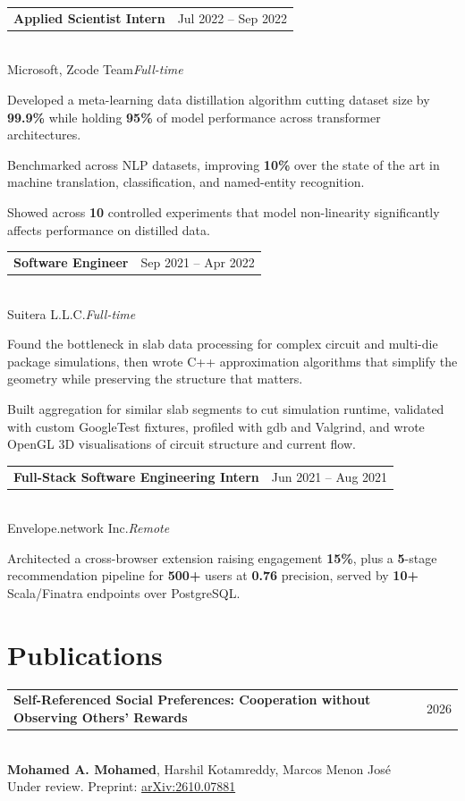 \documentclass[10pt,a4paper]{article}
\makeatletter
\newcommand{\role}[4]{%
  \vspace{3pt}
  \noindent\begin{tabularx}{\textwidth}{@{}Xr@{}}
    \textbf{#1} & \textcolor{muted}{\small #4}
  \end{tabularx}\\[1pt]
  \textcolor{accent}{#2}\;\textcolor{muted}{\small\textit{#3}}\vspace{2pt}
}
\newcommand{\paper}[4]{%
  \vspace{4pt}
  \noindent\begin{tabularx}{\textwidth}{@{}Xr@{}}
    \textbf{#1} & \textcolor{muted}{\small #4}
  \end{tabularx}\\[1pt]
  {\small #2}\\[1pt]
  {\small\textcolor{accent}{#3}}\vspace{2pt}
}
\makeatother
\begin{document}
\role{Applied Scientist Intern}{Microsoft, Zcode Team}{Full-time}{Jul 2022 -- Sep 2022}
\begin{pts}
  \item Developed a meta-learning data distillation algorithm cutting dataset size by \textbf{99.9\%} while holding \textbf{95\%} of model performance across transformer architectures.
  \item Benchmarked across NLP datasets, improving \textbf{10\%} over the state of the art in machine translation, classification, and named-entity recognition.
  \item Showed across \textbf{10} controlled experiments that model non-linearity significantly affects performance on distilled data.
\end{pts}

\role{Software Engineer}{Suitera L.L.C.}{Full-time}{Sep 2021 -- Apr 2022}
\begin{pts}
  \item Found the bottleneck in slab data processing for complex circuit and multi-die package simulations, then wrote C++ approximation algorithms that simplify the geometry while preserving the structure that matters.
  \item Built aggregation for similar slab segments to cut simulation runtime, validated with custom GoogleTest fixtures, profiled with gdb and Valgrind, and wrote OpenGL 3D visualisations of circuit structure and current flow.
\end{pts}

\role{Full-Stack Software Engineering Intern}{Envelope.network Inc.}{Remote}{Jun 2021 -- Aug 2021}
\begin{pts}
  \item Architected a cross-browser extension raising engagement \textbf{15\%}, plus a \textbf{5}-stage recommendation pipeline for \textbf{500+} users at \textbf{0.76} precision, served by \textbf{10+} Scala/Finatra endpoints over PostgreSQL.
\end{pts}

\section{Publications}

\paper{Self-Referenced Social Preferences: Cooperation without Observing Others' Rewards}
{\textbf{Mohamed A. Mohamed}, Harshil Kotamreddy, Marcos Menon Jos\'e}
{Under review. Preprint: \href{https://arxiv.org/abs/2610.07881}{arXiv:2610.07881}}{2026}
\end{document}
